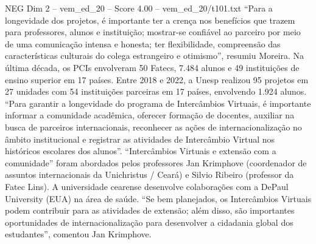 \begin{textsample}{NEG Dim 2 – vem\_ed\_20 – Score 4.00 – vem\_ed\_20/t101.txt}  \label{ex:f2_neg_089}
“Para a longevidade dos projetos, é importante ter a crença nos benefícios que trazem para professores, alunos e instituição; mostrar-se confiável ao parceiro por meio de uma comunicação intensa e honesta; ter flexibilidade, compreensão das características culturais do colega estrangeiro e otimismo”, resumiu Moreira.
Na última década, os PCIs envolveram 50 Fatecs, 7.484 alunos e 49 instituições de ensino superior em 17 países.
Entre 2018 e 2022, a Unesp realizou 95 projetos em 27 unidades com 54 instituições parceiras em 17 países, envolvendo 1.924 alunos. “Para garantir a longevidade do programa de Intercâmbios Virtuais, é importante informar a comunidade acadêmica, oferecer formação de docentes, auxiliar na busca de parceiros internacionais, reconhecer as ações de internacionalização no âmbito institucional e registrar as atividades de Intercâmbio Virtual nos históricos escolares dos alunos”. “Intercâmbios Virtuais e extensão com a comunidade” foram abordados pelos professores Jan Krimphove (coordenador de assuntos internacionais da Unichristus / Ceará) e Silvio Ribeiro (professor da Fatec Lins).
A universidade cearense desenvolve colaborações com a DePaul University (EUA) na área de saúde. “Se bem planejados, os Intercâmbios Virtuais podem contribuir para as atividades de extensão; além disso, são importantes oportunidades de internacionalização para desenvolver a cidadania global dos estudantes”, comentou Jan Krimphove.

\end{textsample}
